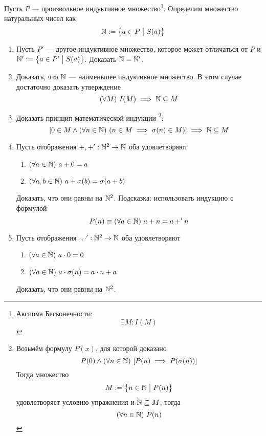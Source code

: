 \begin{enumerate}
	Пусть $P$ --- произвольное индуктивное множество\footnote{
		Аксиома Бесконечности:
		\[
			\exists M:I(M)
		\]}.
	Определим множество натуральных чисел как
	\[
		\mathbb N:=\left\{a\in P\;\big|\; S(a)\right\}
	\]
	\begin{enumerate}
		\item{}Пусть $P'$ --- другое индуктивное множество, которое может
		отличаться от $P$ и $\mathbb N':=\left\{a\in P'\;\big|\; S(a)\right\}$.
		Доказать $\mathbb N=\mathbb N'$.
		\item{}Доказать, что $\mathbb N$ --- наименьшее индуктивное множество.
		В этом случае достаточно доказать утверждение
		\[
			(\forall M)~I(M)\implies\mathbb N\subseteq M
		\]
		\item{}Доказать принцип математической индукции
		\footnote{Возьмём формулу $P(x)$,
		для которой доказано
		\[
			P(0)\land (\forall n\in\mathbb N)~[P(n)\implies P(\sigma(n))]
		\]
		Тогда множество
		\[
			M:=\left\{n\in\mathbb N\;\big|\; P(n)\right\}
		\]
		удовлетворяет условию упражнения и $\mathbb N\subseteq M$,
		тогда
		\[
			(\forall n\in\mathbb N)~P(n)
		\]}:
		\[
			[0\in M\land (\forall n\in\mathbb N)~(n\in M\implies
					\sigma(n)\in M)]\implies \mathbb N\subseteq M
		\]
		\item{}Пусть отображения $+,+':\mathbb N^{2}\to\mathbb N$ оба удовлетворяют
		\begin{enumerate}
			\item{}$(\forall a\in\mathbb N)~a+0=a$
			\item{}$(\forall a,b\in\mathbb N)~a+\sigma(b)=\sigma(a+b)$
		\end{enumerate}
		Доказать, что они равны на $\mathbb N^{2}$. Подсказка:
		использовать индукцию с формулой
		\[
			P(n)\equiv (\forall a\in\mathbb N)~a+n=a+'n
		\]
		\item{}Пусть отображения $\cdot,\cdot':\mathbb N^{2}\to\mathbb N$ оба удовлетворяют
		\begin{enumerate}
			\item{}$(\forall a\in\mathbb N)~a\cdot 0=0$
			\item{}$(\forall a\in\mathbb N)~a\cdot\sigma(n)=a\cdot n+a$
		\end{enumerate}
		Доказать, что они равны на $\mathbb N^{2}$.
	\end{enumerate}
\end{enumerate}
